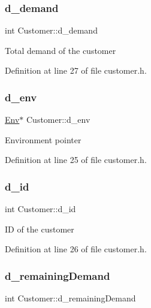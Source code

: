 \subsubsection{\texorpdfstring{d\+\_\+demand}{d\_demand}}
{\footnotesize\ttfamily int Customer\+::d\+\_\+demand\hspace{0.3cm}{\ttfamily [private]}}

Total demand of the customer 

Definition at line 27 of file customer.\+h.

\mbox{\label{class_customer_a3bab068704f4b100581f694b1b5d498e}} 
\subsubsection{\texorpdfstring{d\+\_\+env}{d\_env}}
{\footnotesize\ttfamily \hyperlink{class_env}{Env}$\ast$ Customer\+::d\+\_\+env\hspace{0.3cm}{\ttfamily [private]}}

Environment pointer 

Definition at line 25 of file customer.\+h.

\mbox{\label{class_customer_aec19536bdd04638512d821cd699481e1}} 
\subsubsection{\texorpdfstring{d\+\_\+id}{d\_id}}
{\footnotesize\ttfamily int Customer\+::d\+\_\+id\hspace{0.3cm}{\ttfamily [private]}}

ID of the customer 

Definition at line 26 of file customer.\+h.

\mbox{\label{class_customer_a24e8165587de656159a3fdd3eaa680ad}} 
\subsubsection{\texorpdfstring{d\+\_\+remaining\+Demand}{d\_remainingDemand}}
{\footnotesize\ttfamily int Customer\+::d\+\_\+remaining\+Demand\hspace{0.3cm}{\ttfamily [private]}}

